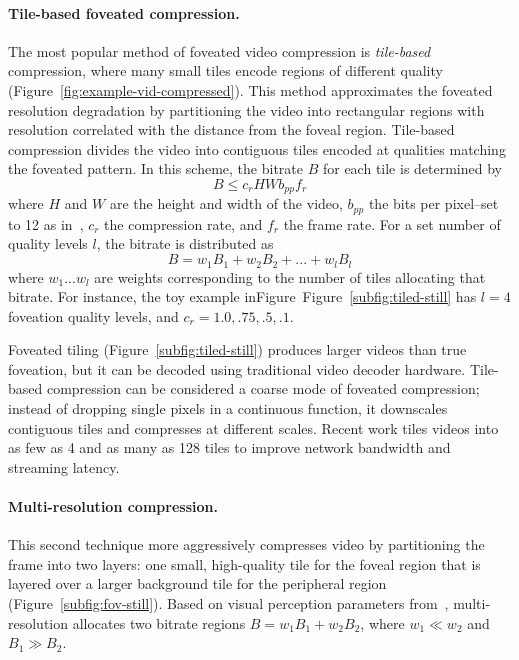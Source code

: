 \paragraph{Tile-based foveated compression.}
The most popular method of foveated video compression is \emph{tile-based} compression, where many small tiles encode regions of different quality (Figure~\ref{fig:example-vid-compressed}).
This method approximates the foveated resolution degradation by partitioning the video into rectangular regions with resolution correlated with the distance from the foveal region.
Tile-based compression divides the video into contiguous tiles encoded at qualities matching the foveated pattern.
In this scheme, the bitrate $B$ for each tile is determined by
\begin{equation}
    B \leq c_{r}HWb_{pp}f_{r}
\end{equation}
where $H$ and $W$ are the height and width of the video, $b_{pp}$ the bits per pixel--set to 12 as in~\cite{kaplanyan2019deepfovea}, $c_r$ the compression rate, and $f_r$ the frame rate.
For a set number of quality levels $l$, the bitrate is distributed as
\begin{equation}B = w_{1}B_{1} + w_{2}B_{2} + ... + w_{l}B_{l}
\end{equation}
where $w_{1} ... w_{l}$ are weights corresponding to the number of tiles allocating that bitrate.
For instance, the toy example inFigure~Figure~\ref{subfig:tiled-still} has $l=4$ foveation quality levels, and $c_r = {1.0, .75, .5, .1}$.

Foveated tiling (Figure~\ref{subfig:tiled-still}) produces larger videos than true foveation, but it can be decoded using traditional video decoder hardware.
Tile-based compression can be considered a coarse mode of foveated compression; instead of dropping single pixels in a continuous function, it downscales contiguous tiles and compresses at different scales.
Recent work tiles videos into as few as 4 and as many as 128 tiles to improve network bandwidth and streaming latency.

\paragraph{Multi-resolution compression.} This second technique more aggressively compresses video by partitioning the frame into two layers: one small, high-quality tile for the foveal region that is layered over a larger background tile for the peripheral region~\cite{guenter2012foveated}  (Figure~\ref{subfig:fov-still}).
Based on visual perception parameters from~\cite{guenter2012foveated}, multi-resolution allocates two bitrate regions $B = w_{1}B_{1} + w_{2}B_{2}$, where $w_{1} \ll w_{2}$ and $B_{1} \gg B_{2}$.

